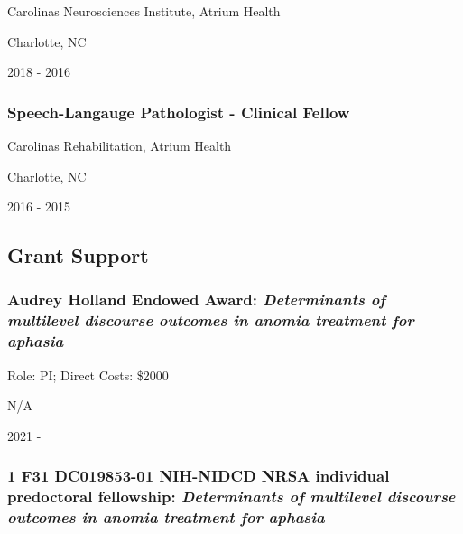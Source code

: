 \documentclass[
]{article}
\begin{document}
Carolinas Neurosciences Institute, Atrium Health

Charlotte, NC

2018 - 2016

\hypertarget{speech-langauge-pathologist---clinical-fellow}{%
\subsubsection{Speech-Langauge Pathologist - Clinical
Fellow}\label{speech-langauge-pathologist---clinical-fellow}}

Carolinas Rehabilitation, Atrium Health

Charlotte, NC

2016 - 2015

\hypertarget{grant-support}{%
\subsection{Grant Support}\label{grant-support}}

\hypertarget{audrey-holland-endowed-award-determinants-of-multilevel-discourse-outcomes-in-anomia-treatment-for-aphasia}{%
\subsubsection{\texorpdfstring{Audrey Holland Endowed Award:
\emph{Determinants of multilevel discourse outcomes in anomia treatment
for
aphasia}}{Audrey Holland Endowed Award: Determinants of multilevel discourse outcomes in anomia treatment for aphasia}}\label{audrey-holland-endowed-award-determinants-of-multilevel-discourse-outcomes-in-anomia-treatment-for-aphasia}}

Role: PI; Direct Costs: \$2000

N/A

2021 -

\hypertarget{f31-dc019853-01-nih-nidcd-nrsa-individual-predoctoral-fellowship-determinants-of-multilevel-discourse-outcomes-in-anomia-treatment-for-aphasia}{%
\subsubsection{\texorpdfstring{1 F31 DC019853-01 NIH-NIDCD NRSA
individual predoctoral fellowship: \emph{Determinants of multilevel
discourse outcomes in anomia treatment for
aphasia}}{1 F31 DC019853-01 NIH-NIDCD NRSA individual predoctoral fellowship: Determinants of multilevel discourse outcomes in anomia treatment for aphasia}}\label{f31-dc019853-01-nih-nidcd-nrsa-individual-predoctoral-fellowship-determinants-of-multilevel-discourse-outcomes-in-anomia-treatment-for-aphasia}}
\end{document}
